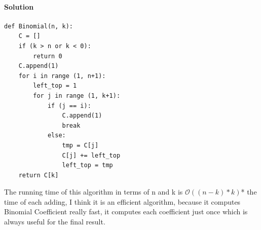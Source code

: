 \documentclass[12pt,a4]{article}
\begin{document}
\paragraph{Solution}
\begin{verbatim}
def Binomial(n, k): 
    C = []
    if (k > n or k < 0):
        return 0
    C.append(1)
    for i in range (1, n+1):
        left_top = 1
        for j in range (1, k+1):
            if (j == i): 
                C.append(1)
                break
            else: 
                tmp = C[j]
                C[j] += left_top
                left_top = tmp
    return C[k]
\end{verbatim}
The running time of this algorithm in terms of n and k is $\mathcal{O} ((n-k)*k)$* the time of each adding, I think it is an efficient algorithm, because it computes Binomial Coefficient really fast, it computes each coefficient just once which is always useful for the final result.
\end{document}
